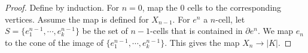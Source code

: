 \begin{proof}
Define by induction. For $n=0$, map the $0$ cells to the corresponding vertices. Assume the map is defined for $X_{n-1}$. For $e^n$ a $n$-cell, let $S=\{e^{n-1}_1,\cdots,e^{n-1}_k\}$ be the set of $n-1$-cells that is contained in $\partial e^n$. We map $e_n$ to the cone of the image of $\{e^{n-1}_1,\cdots,e^{n-1}_k\}$. This gives the map $X_n\to |K|$.
\end{proof}